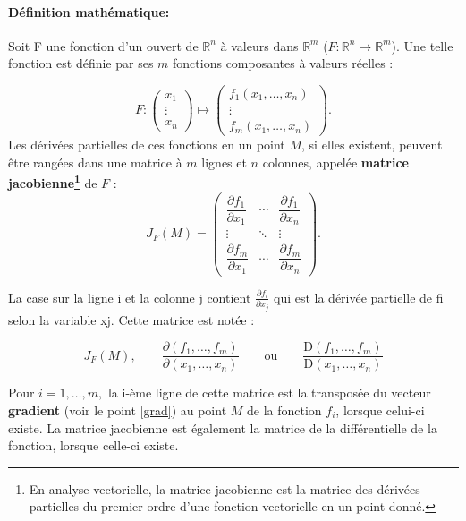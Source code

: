 	\paragraph*{Définition mathématique:}
	Soit F une fonction d'un ouvert de $\mathbb{R}^{n}$ à valeurs dans $\mathbb{R}^{m}$ ($F:\mathbb{R}^{n}\to \mathbb {R}^{m}$). Une telle fonction est définie par ses $m$ fonctions composantes à valeurs réelles :
	
	$$ 
	{ F:
		{\begin{pmatrix}
			x_{1}\\\vdots \\
			x_{n}
		\end{pmatrix}}
		\longmapsto 
		{\begin{pmatrix}
			f_{1}(x_{1},\dots ,x_{n})\\
			\vdots \\f_{m}(x_{1},\dots ,x_{n})
		\end{pmatrix}}}.
	$$
	Les dérivées partielles de ces fonctions en un point $M$, si elles existent, peuvent être rangées dans une matrice à $m$ lignes et $n$ colonnes, appelée \textbf{matrice jacobienne\footnote{En analyse vectorielle, la matrice jacobienne est la matrice des dérivées partielles du premier ordre d'une fonction vectorielle en un point donné.}} de $F$ :
	$$
	J_{F}\left(M\right)={
		\begin{pmatrix}
			{\dfrac {\partial f_{1}}{\partial x_{1}}}&\cdots &{\dfrac {\partial f_{1}}{\partial x_{n}}}\\
			\vdots &\ddots &\vdots \\
			{\dfrac {\partial f_{m}}{\partial x_{1}}}&\cdots &{\dfrac {\partial f_{m}}{\partial x_{n}}}
		\end{pmatrix}}.
	$$
	
	La case sur la ligne i et la colonne j contient ${\displaystyle {\frac {\partial f_{i}}{\partial x_{j}}}}$ qui est la dérivée partielle de fi selon la variable xj. Cette matrice est notée :
	
	$${\displaystyle J_{F}\left(M\right),\qquad {\frac {\partial \left(f_{1},\ldots ,f_{m}\right)}{\partial \left(x_{1},\ldots ,x_{n}\right)}}\qquad {\text{ou}}\qquad {\frac {\mathrm {D} \left(f_{1},\ldots ,f_{m}\right)}{\mathrm {D} \left(x_{1},\ldots ,x_{n}\right)}}}$$
	
	Pour $i = 1, … , m,$ la i-ème ligne de cette matrice est la transposée du vecteur \textbf{gradient} (voir le point \ref{grad}) au point $M$ de la fonction $f_i$, lorsque celui-ci existe. La matrice jacobienne est également la matrice de la différentielle de la fonction, lorsque celle-ci existe.
